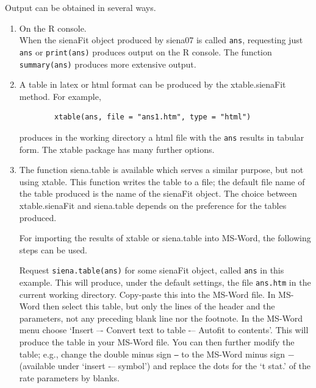 \documentclass[a4paper,fleqn,11pt]{article}
\newcommand{\+}{\, + \,}
\newcommand{\sfn}[1]{\textsf{#1}}
\newcommand{\R}{{\sf R }}
\begin{document}
Output can be obtained in several ways.
\begin{enumerate}
  \item On the \R console.\\
        When the \textsf{sienaFit} object produced by \textsf{siena07}
        is called \texttt{ans},
        requesting just \texttt{ans} or \texttt{print(ans)}
        produces output on the \R console. The function
        \texttt{summary(ans)} produces more extensive output.
  \item A table in latex or html format can be produced by the
        \textsf{xtable.sienaFit} method.
        For example,
        \begin{verbatim}
        xtable(ans, file = "ans1.htm", type = "html")
        \end{verbatim}
        produces in the working directory a html file with the \texttt{ans}
        results in
        tabular form. The \textsf{xtable} package has many further options.\\
  \item The function \textsf{siena.table}
        is available which serves a similar purpose,
        but not using \textsf{xtable}.
        This function writes the table to a file;
        the default file name of the table produced is the name of the
        \sfn{sienaFit} object.
        The choice between \textsf{xtable.sienaFit} and \textsf{siena.table}
        depends on the preference for the tables produced.

        For importing the results of \sfn{xtable} or \textsf{siena.table} into
        MS-Word, the following steps can be used.

        Request \texttt{siena.table(ans)} for some \sfn{sienaFit} object,
        called \texttt{ans} in this example. This will produce,
        under the default settings, the file \texttt{ans.htm} in the current
        working directory.
        Copy-paste this into the MS-Word file.
        In MS-Word then select this table, but
        only the lines of the header and the parameters, not any
        preceding blank line nor the footnote.
        In the MS-Word menu choose `Insert –- Convert text to table -–
        Autofit to contents'.
        This will produce the table in your MS-Word file.
        You can then further modify the table; e.g., change the double minus
        sign \texttt{--} to the MS-Word minus sign $ - $
        (available under `insert -– symbol') and replace the dots for the
        `t stat.' of the rate parameters by blanks.


\end{enumerate}
\end{document}
